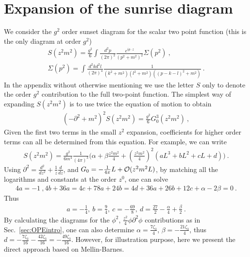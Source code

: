 \documentclass[a4paper,11pt]{article}
\begin{document}
\section{Expansion of the sunrise diagram}\label{sec:sunrise}
We consider the $g^2$ order sunset diagram for the scalar two point function (this is the only diagram at order $g^2$)
\begin{align}
S(z^2m^2)=\frac{g^2}{6}\int \frac{d^2p}{(2\pi)^2}\frac{e^{ip\cdot z}}{(p^2+m^2)^2}\Sigma(p^2) \ , \\
\Sigma(p^2)=\int \frac{d^2k d^2l}{(2\pi)^4}\frac{1}{(k^2+m^2)(l^2+m^2)((p-k-l)^2+m^2)} \ .
\end{align}
In the appendix without otherwise mentioning we use the letter $S$ only to denote the order $g^2$ contribution to the full two-point function.
The simplest way of expanding $S(z^2m^2)$ is to use twice the equation of motion to obtain
\begin{align}
(-\partial^2+m^2)^2S(z^2m^2)=\frac{g^2}{6}G_0^3(z^2m^2) \ , 
\end{align}
Given the first two terms in the small $z^2$ expansion, coefficients for higher order terms can all be determined from this equation. For example, we can write
\begin{align}
S(z^2m^2)=\frac{g^2}{6m^4}\frac{1}{(4\pi)^3}\bigg(\alpha+\beta \frac{z^2m^2}{4}+\left(\frac{z^2m^2}{4}\right)^2\left(aL^3+bL^2+cL+d\right) \bigg)\ .
\end{align}
Using $\partial^2=\frac{d^2}{dz^2}+\frac{1}{z}\frac{d}{dz}$, and $G_0=-\frac{1}{4\pi}L+{\cal O}(z^2m^2L)$, by matching all the logarithms and constants at the order $z^0$, one can solve
\begin{align}
4a=-1 \ , 4b+36a=4c+78a+24b=4d+36a+26b+12c+\alpha-2\beta=0 \ .
\end{align}
Thus
\begin{align}
a=-\frac{1}{4}, \ b=\frac{9}{4}, \  c=-\frac{69}{8} , \ d=\frac{27}{2}-\frac{\alpha}{4}+\frac{\beta}{2} \ . 
\end{align}
By calculating the diagrams for the $\phi^2$, $\frac{z^2}{4}\phi\partial^2\phi$ contributions as in Sec.~\ref{sec:OPEintro}, one can also determine $\alpha=\frac{7\zeta_3}{4}$, $\beta=-\frac{21\zeta_3}{4}$, thus $d=-\frac{7\zeta_3}{16}-\frac{42\zeta_3}{16}=-\frac{49\zeta_3}{16}$.
However, for illustration purpose, here we present the direct approach based on Mellin-Barnes. 
\end{document}
